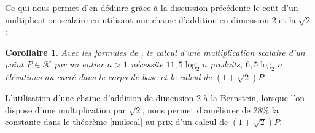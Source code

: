 \documentclass[a4paper]{article}
\newtheorem{corollaire}[theoreme]{Corollaire}
\theoremstyle{definition}
\theoremstyle{remark}
\numberwithin{equation}{section}
\begin{document}
Ce qui nous permet d'en déduire grâce à la discussion précédente le coût d'un multiplication scalaire en utilisant une chaine d'addition en dimension 2 et la $\sqrt{2}$ :
\begin{corollaire}
Avec les formules de \citep{gaudry}, le calcul d'une multiplication scalaire d'un point $P \in \mathcal{K}$ par un entier $n > 1$ nécessite $11,5\log_2 n$ produits, $6,5\log_2 n$ élévations au carré dans le corps de base et le calcul de $(1+\sqrt{2})P$.
\end{corollaire}

L'utilisation d'une chaine d'addition de dimension 2 à la Bernstein, lorsque l'on dispose d'une multiplication par $\sqrt{2}$, nous permet d'améliorer de 28\% la constante dans le théorème \ref{mulscal} au prix d'un calcul de $(1+\sqrt{2})P$.
\end{document}
